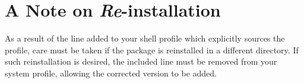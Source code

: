 \documentclass[12pt,twoside]{article}
\begin{document}




\section{A Note on {\it Re}-installation}

As a result of the line added to your shell profile which explicitly
sources the \healpix profile, care must be taken if the package 
is reinstalled in a different directory. If such reinstallation
is desired, the included line must be removed from your system profile,
allowing the corrected version to be added.  
\end{document}
